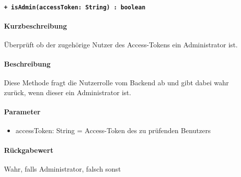 \paragraph{\texttt{+ isAdmin(accessToken: String) : boolean}}%
\paragraph*{Kurzbeschreibung}
Überprüft ob der zugehörige Nutzer des Access-Tokens ein Administrator ist.
\paragraph*{Beschreibung}
Diese Methode fragt die Nutzerrolle vom Backend ab und gibt dabei wahr zurück, wenn dieser ein Administrator ist.
\paragraph*{Parameter}
\begin{itemize}
    \item accessToken: String = Access-Token des zu prüfenden Benutzers
\end{itemize}
\paragraph*{Rückgabewert}
Wahr, falls Administrator, falsch sonst